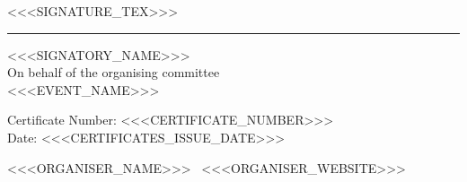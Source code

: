 \documentclass[a4paper,12pt]{article}
\newcommand{\CertificateDate}{<<<CERTIFICATES_ISSUE_DATE>>>}
\newcommand{\CertificateNumber}{<<<CERTIFICATE_NUMBER>>>}
\begin{document}
<<<SIGNATURE_TEX>>>
\rule{55mm}{0.4pt}

\vspace{2mm}

<<<SIGNATORY_NAME>>>\\
On behalf of the organising committee\\
<<<EVENT_NAME>>>

\vfill


\small
Certificate Number: \CertificateNumber\\
Date: \CertificateDate

\vspace{8mm}

\begin{center}
\footnotesize
<<<ORGANISER_NAME>>> \textbullet\ <<<ORGANISER_WEBSITE>>>
\end{center}
\end{document}
